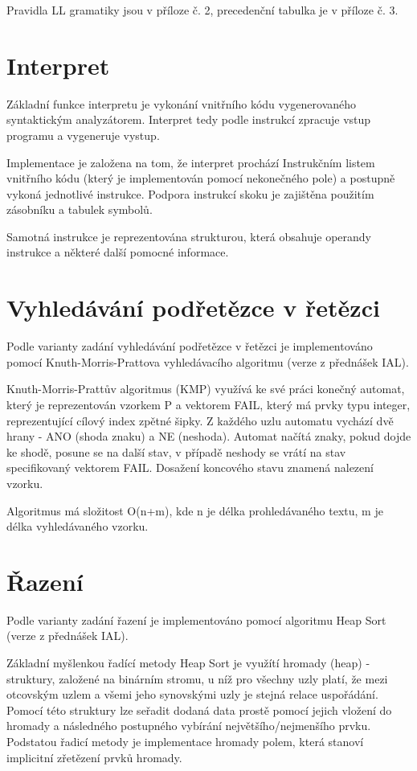 \documentclass[12pt,a4paper,titlepage,final]{report}
\begin{document}
Pravidla LL gramatiky jsou v příloze č. 2, precedenční tabulka je v příloze č. 3.

\section{Interpret}
Základní funkce interpretu je vykonání vnitřního kódu vygenerovaného syntaktickým analyzátorem. Interpret tedy podle instrukcí zpracuje vstup programu a vygeneruje vystup.

Implementace je založena na tom, že interpret prochází Instrukčním listem vnitřního kódu (který je implementován pomocí nekonečného pole) a postupně vykoná jednotlivé instrukce. Podpora instrukcí skoku je zajištěna použitím zásobníku a tabulek symbolů.

Samotná instrukce je reprezentována strukturou, která obsahuje operandy instrukce a některé další pomocné informace.

\section{Vyhledávání podřetězce v řetězci}
Podle varianty zadání vyhledávání podřetězce v řetězci je implementováno pomocí Knuth-Morris-Prattova vyhledávacího algoritmu (verze z přednášek IAL).

Knuth-Morris-Prattův algoritmus (KMP) využívá ke své práci konečný automat, který je reprezentován vzorkem P a vektorem FAIL, který má prvky typu integer, reprezentující cílový index zpětné šipky. Z každého uzlu automatu vychází dvě hrany - ANO (shoda znaku) a NE (neshoda). Automat načítá znaky, pokud dojde ke shodě, posune se na další stav, v případě neshody se vrátí na stav specifikovaný vektorem FAIL. Dosažení koncového stavu znamená nalezení vzorku.

Algoritmus má složitost O(n+m), kde n je délka prohledávaného textu, m je délka vyhledávaného vzorku.

\section{Řazení}
Podle varianty zadání řazení je implementováno pomocí algoritmu Heap Sort (verze z přednášek IAL).

Základní myšlenkou řadící metody Heap Sort je využítí hromady (heap) - struktury, založené na binárním stromu, u níž pro všechny uzly platí, že mezi otcovským uzlem a všemi jeho synovskými uzly je stejná relace uspořádání. Pomocí této struktury lze seřadit dodaná data prostě pomocí jejich vložení do hromady a následného postupného vybírání největšího/nejmenšího prvku. Podstatou řadicí metody je implementace hromady polem, která stanoví implicitní zřetězení prvků hromady.
\end{document}
